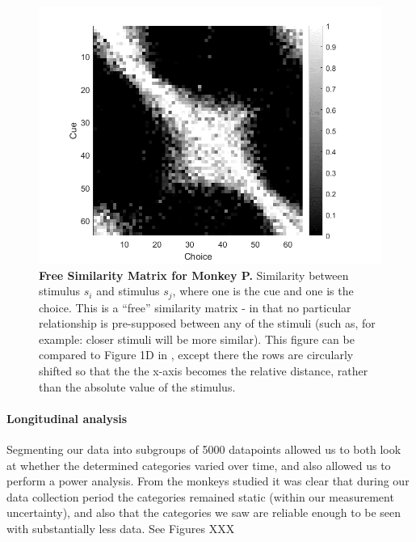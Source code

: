 \begin{figure}
\includegraphics[width=\linewidth]{../../Figures/working/SimilarityMatrixPollux.png}
\caption{\textbf{Free Similarity Matrix for Monkey P.}
Similarity between stimulus $s_i$ and stimulus $s_j$, where one is the cue and one is the choice. This is a ``free'' similarity matrix - in that no particular relationship is pre-supposed between any of the stimuli (such as, for example: closer stimuli will be more similar). This figure can be compared to Figure 1D in \cite{schurgin_psychophysical_2020}, except there the rows are circularly shifted so that the the x-axis becomes the relative distance, rather than the absolute value of the stimulus. %
} 
\label{fig:SimilarityMatrixPollux}
\end{figure}

\paragraph{Longitudinal analysis}

Segmenting our data into subgroups of 5000 datapoints allowed us to both look at whether the determined categories varied over time, and also allowed us to perform a power analysis. From the monkeys studied it was clear that during our data collection period the categories remained static (within our measurement uncertainty), and also that the categories we saw are reliable enough to be seen with substantially less data. See Figures XXX %